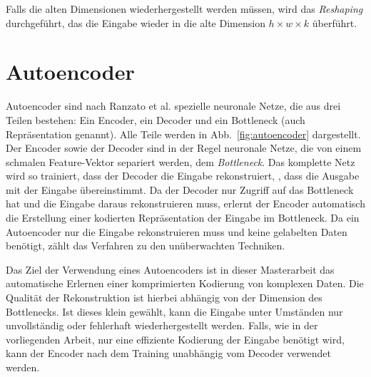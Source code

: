 Falls die alten Dimensionen wiederhergestellt werden müssen, wird das \emph{Reshaping} durchgeführt, das die Eingabe wieder in die alte Dimension $h \times w \times k$ überführt.

\section{Autoencoder}
Autoencoder sind nach Ranzato et al. \cite{ranzatoUnsupervisedLearningInvariant2007} spezielle neuronale Netze, die aus drei Teilen bestehen: Ein Encoder, ein Decoder und ein Bottleneck (auch Repräsentation genannt). Alle Teile werden in Abb.~\ref{fig:autoencoder} dargestellt. Der Encoder sowie der Decoder sind in der Regel neuronale Netze, die von einem schmalen Feature-Vektor separiert werden, dem \emph{Bottleneck}. Das komplette Netz wird so trainiert, dass der Decoder die Eingabe rekonstruiert, \dh, dass die Ausgabe mit der Eingabe übereinstimmt. Da der Decoder nur Zugriff auf das Bottleneck hat und die Eingabe daraus rekonstruieren muss, erlernt der Encoder automatisch die Erstellung einer kodierten Repräsentation der Eingabe im Bottleneck. Da ein Autoencoder nur die Eingabe rekonstruieren muss und keine gelabelten Daten benötigt, zählt das Verfahren zu den unüberwachten Techniken.



Das Ziel der Verwendung eines Autoencoders ist in dieser Masterarbeit das automatische Erlernen einer komprimierten Kodierung von komplexen Daten. Die Qualität der Rekonstruktion ist hierbei abhängig von der Dimension des Bottlenecks. Ist dieses klein gewählt, kann die Eingabe unter Umständen nur unvollständig oder fehlerhaft wiederhergestellt werden.
Falls, wie in der vorliegenden Arbeit, nur eine effiziente Kodierung der Eingabe benötigt wird, kann der Encoder nach dem Training unabhängig vom Decoder verwendet werden.

